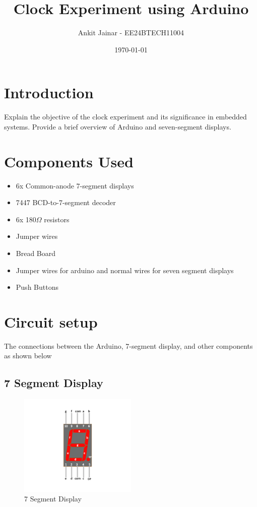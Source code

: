 \documentclass[journal]{IEEEtran}
\title{\textbf{Clock Experiment using Arduino}}
\author{Ankit Jainar - EE24BTECH11004}
\date{\today}
\begin{document}
\maketitle


\tableofcontents
\newpage

\section{Introduction}
Explain the objective of the clock experiment and its significance in embedded systems. Provide a brief overview of Arduino and seven-segment displays.

\section{Components Used}

\begin{itemize}
 \item 6x Common-anode 7-segment displays
    \item 7447 BCD-to-7-segment decoder
    \item 6x 180$\Omega$ resistors 
    \item Jumper wires
    \item Bread Board
    \item Jumper wires for arduino and normal wires for seven segment displays
    \item Push Buttons
\end{itemize}

\section{Circuit setup}
The connections between the Arduino, 7-segment display, and other components as shown below
\subsection{7 Segment Display}
\begin{figure}[h]
    \centering
    \includegraphics[width=0.5\textwidth]{figs/1.png} %
    \caption{7 Segment Display}
    
\end{figure}
\end{document}
